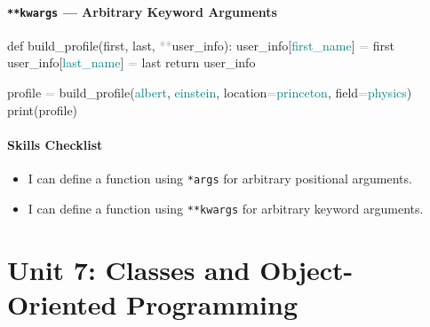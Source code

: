\documentclass[
  justified,
  openright,
]{tufte-book}
\let\subsubsection\paragraph
\let\paragraph\paragraph
\newcommand{\BuiltInTok}[1]{#1}
\newcommand{\ControlFlowTok}[1]{\textcolor{BrandBlue}{#1}}
\newcommand{\KeywordTok}[1]{\textcolor{BrandBlue}{#1}}
\newcommand{\NormalTok}[1]{#1}
\newcommand{\OperatorTok}[1]{\textcolor{DarkGray}{#1}}
\newcommand{\StringTok}[1]{\textcolor{Teal}{#1}}
\newenvironment{Shaded}{%
  \begin{snugshade}
}{%
  \end{snugshade}
}
\let\subsubsection\paragraph
\let\paragraph\paragraph
\providecommand{\tightlist}{%
  \setlength{\itemsep}{0pt}\setlength{\parskip}{0pt}}
\begin{document}
\subsubsection{\texorpdfstring{\texttt{**kwargs} --- Arbitrary Keyword
Arguments}{**kwargs --- Arbitrary Keyword Arguments}}\label{kwargs-arbitrary-keyword-arguments}

\begin{Shaded}
\begin{Highlighting}[]
\KeywordTok{def}\NormalTok{ build\_profile(first, last, }\OperatorTok{**}\NormalTok{user\_info):}
\NormalTok{    user\_info[}\StringTok{\textquotesingle{}first\_name\textquotesingle{}}\NormalTok{] }\OperatorTok{=}\NormalTok{ first}
\NormalTok{    user\_info[}\StringTok{\textquotesingle{}last\_name\textquotesingle{}}\NormalTok{] }\OperatorTok{=}\NormalTok{ last}
    \ControlFlowTok{return}\NormalTok{ user\_info}

\NormalTok{profile }\OperatorTok{=}\NormalTok{ build\_profile(}\StringTok{\textquotesingle{}albert\textquotesingle{}}\NormalTok{, }\StringTok{\textquotesingle{}einstein\textquotesingle{}}\NormalTok{,}
\NormalTok{                        location}\OperatorTok{=}\StringTok{\textquotesingle{}princeton\textquotesingle{}}\NormalTok{,}
\NormalTok{                        field}\OperatorTok{=}\StringTok{\textquotesingle{}physics\textquotesingle{}}\NormalTok{)}
\BuiltInTok{print}\NormalTok{(profile)}
\end{Highlighting}
\end{Shaded}

\subsubsection{Skills Checklist}\label{skills-checklist-31}

\begin{itemize}
\tightlist
\item[$\square$]
  I can define a function using \texttt{*args} for arbitrary positional
  arguments.
\item[$\square$]
  I can define a function using \texttt{**kwargs} for arbitrary keyword
  arguments.
\end{itemize}

\newpage

\section{Unit 7: Classes and Object-Oriented
Programming}\label{unit-7-classes-and-object-oriented-programming-1}
\end{document}
